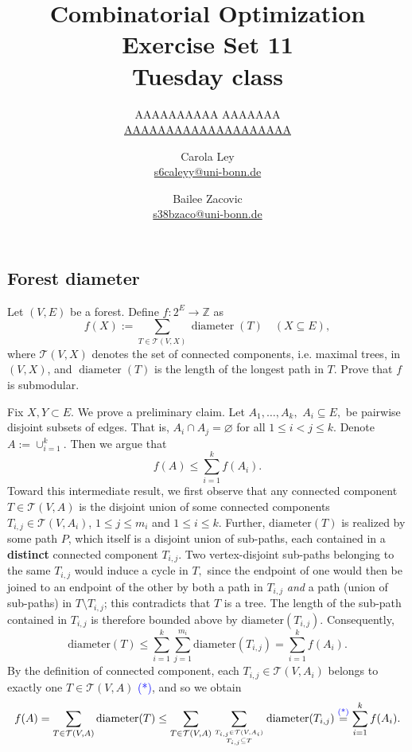 \documentclass{article}
\title{Combinatorial Optimization \\ Exercise Set 11 \\ Tuesday class}
\author{
  AAAAAAAAAA AAAAAAA \\
  \href{mailto:AAAAAAAAAAAAAAAAAAAA}{AAAAAAAAAAAAAAAAAAAA}
  \and
  Carola Ley \\
  \href{mailto:s6caleyy@uni-bonn.de}{s6caleyy@uni-bonn.de}
  \and
  Bailee Zacovic \\
  \href{mailto:s38bzaco@uni-bonn.de}{s38bzaco@uni-bonn.de}
}
\let\emptyset\varnothing
\newcommand{\Z}{\mathbb{Z}}
\newcommand{\diameter}{\operatorname{diameter}}
\begin{document}
  \maketitle

  \setcounter{section}{11}
  \subsection{Forest diameter}
  \begin{centerframebox}
    Let $(V, E)$ be a forest. Define $f : 2^E \to \Z$ as
    \[ f(X) := \sum_{T \in \mathcal{T}(V,X) } \diameter(T) \quad (X\subseteq E), \]
    where $\mathcal{T}(V, X)$ denotes the set of connected components, i.e. maximal trees, in
    $(V, X)$, and $\diameter(T)$ is the length of the longest path in $T$. Prove that $f$ is
    submodular.
  \end{centerframebox}
  Fix $X,Y\subset E.$ We prove a preliminary claim. Let $A_1,\dots,A_k,$ $A_i\subseteq E,$ be pairwise disjoint subsets of edges. That is, $A_i\cap A_j=\emptyset$ for all $1\leq i<j\leq k.$ Denote $A:=\cup_{i=1}^k.$ Then we argue that\begin{equation}
       f\left(A\right)\leq \sum_{i=1}^k f(A_i).
  \end{equation}
  Toward this intermediate result, we first observe that any connected component $T\in \mathcal{T}(V,A)$ is the disjoint union of some connected components $T_{i,j}\in \mathcal{T}(V,A_i)$, $1\leq j\leq m_i$ and $1\leq i\leq k.$ Further, $\text{diameter}(T)$ is realized by some path $P$, which itself is a disjoint union of sub-paths, each contained in a \textbf{distinct} connected component $T_{i,j}$. Two vertex-disjoint sub-paths belonging to the same $T_{i,j}$ would induce a cycle in $T,$ since the endpoint of one would then be joined to an endpoint of the other by both a path in $T_{i,j}$ \textit{and} a path (union of sub-paths) in $T\setminus T_{i,j}$; this contradicts that $T$ is a tree. The length of the sub-path contained in $T_{i,j}$ is therefore bounded above by $\text{diameter}(T_{i,j}).$ Consequently,
  $$\text{diameter}(T)\leq \sum_{i=1}^k \sum_{j=1}^{m_i}\text{diameter}(T_{i,j})=\sum_{i=1}^k f(A_i).$$By the definition of connected component, each $T_{i,j}\in \mathcal{T}(V,A_i)$ belongs to exactly one $T\in \mathcal{T}(V,A)$ \textcolor{blue}{(*)}, and so we obtain
  $$f(A)=\sum_{T\in \mathcal{T}(V,A)} \text{diameter}(T)\leq \sum_{T\in \mathcal{T}(V,A)}\sum_{T_{i,j}\in \mathcal{T}(V,A_i)\atop T_{i,j}\subseteq T}\text{diameter}(T_{i,j})\overset{\text{\textcolor{blue}{(*)}}}{=}\sum_{i=1}^k f(A_i).$$
\end{document}
